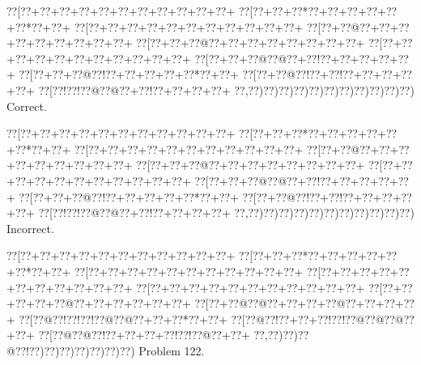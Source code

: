 \documentclass[a5paper]{article}
\begin{document}
\begin{center}
{\goo
\0??[\0??+\0??+\0??+\0??+\0??+\0??+\0??+\0??+\0??+\0??+\0??+
\0??[\0??+\0??+\0??*\0??+\0??+\0??+\0??+\0??+\0??*\0??+\0??+
\0??[\0??+\0??+\0??+\0??+\0??+\0??+\0??+\0??+\0??+\0??+\0??+
\0??[\0??+\0??@\0??+\0??+\0??+\0??+\0??+\0??+\0??+\0??+\0??+
\0??[\0??+\0??+\0??@\0??+\0??+\0??+\0??+\0??+\0??+\0??+\0??+
\0??[\0??+\0??+\0??+\0??+\0??+\0??+\0??+\0??+\0??+\0??+\0??+
\0??[\0??+\0??+\0??@\0??@\0??+\0??!\0??+\0??+\0??+\0??+\0??+
\0??[\0??+\0??+\0??@\0??!\0??+\0??+\0??+\0??+\0??*\0??+\0??+
\0??[\0??+\0??@\0??!\0??+\0??!\0??+\0??+\0??+\0??+\0??+
\0??[\0??!\0??!\0??@\0??@\0??+\0??!\0??+\0??+\0??+\0??+
\0??,\0??)\0??)\0??)\0??)\0??)\0??)\0??)\0??)\0??)\0??)\0??)
}
Correct. 

\end{center}
\begin{center}
{\goo
\0??[\0??+\0??+\0??+\0??+\0??+\0??+\0??+\0??+\0??+\0??+\0??+
\0??[\0??+\0??+\0??*\0??+\0??+\0??+\0??+\0??+\0??*\0??+\0??+
\0??[\0??+\0??+\0??+\0??+\0??+\0??+\0??+\0??+\0??+\0??+\0??+
\0??[\0??+\0??@\0??+\0??+\0??+\0??+\0??+\0??+\0??+\0??+\0??+
\0??[\0??+\0??+\0??@\0??+\0??+\0??+\0??+\0??+\0??+\0??+\0??+
\0??[\0??+\0??+\0??+\0??+\0??+\0??+\0??+\0??+\0??+\0??+\0??+
\0??[\0??+\0??+\0??@\0??@\0??+\0??!\0??+\0??+\0??+\0??+\0??+
\0??[\0??+\0??+\0??@\0??!\0??+\0??+\0??+\0??+\0??*\0??+\0??+
\0??[\0??+\0??@\0??!\0??+\0??!\0??+\0??+\0??+\0??+\0??+
\0??[\0??!\0??!\0??@\0??@\0??+\0??!\0??+\0??+\0??+\0??+
\0??,\0??)\0??)\0??)\0??)\0??)\0??)\0??)\0??)\0??)\0??)\0??)
}
Incorrect. 

\end{center}
\newpage
\begin{center}
{\goo
\0??[\0??+\0??+\0??+\0??+\0??+\0??+\0??+\0??+\0??+\0??+\0??+
\0??[\0??+\0??+\0??*\0??+\0??+\0??+\0??+\0??+\0??*\0??+\0??+
\0??[\0??+\0??+\0??+\0??+\0??+\0??+\0??+\0??+\0??+\0??+\0??+
\0??[\0??+\0??+\0??+\0??+\0??+\0??+\0??+\0??+\0??+\0??+\0??+
\0??[\0??+\0??+\0??+\0??+\0??+\0??+\0??+\0??+\0??+\0??+\0??+
\0??[\0??+\0??+\0??+\0??+\0??@\0??+\0??+\0??+\0??+\0??+\0??+
\0??[\0??+\0??@\0??@\0??+\0??+\0??+\0??@\0??+\0??+\0??+\0??+
\0??[\0??@\0??!\0??!\0??!\0??@\0??@\0??+\0??+\0??*\0??+\0??+
\0??[\0??@\0??!\0??+\0??+\0??!\0??!\0??@\0??@\0??@\0??+\0??+
\0??[\0??@\0??@\0??!\0??+\0??+\0??+\0??!\0??!\0??@\0??+\0??+
\0??,\0??)\0??)\0??@\0??!\0??)\0??)\0??)\0??)\0??)\0??)\0??)
}
Problem 122.

\end{center}
\end{document}

